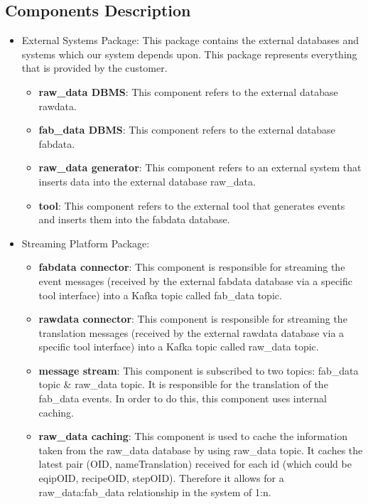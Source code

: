 \subsection{Components Description}
\begin{itemize}
    \item External Systems Package: This package contains the external databases and systems which our system depends upon.
    This package represents everything that is provided by the customer.
    \begin{itemize}
        \item \textbf{raw\_data DBMS}: This component refers to the external database raw\textunderscore data.
        \item \textbf{fab\_data DBMS}: This component refers to the external database fab\textunderscore data.
        \item \textbf{raw\_data generator}: This component refers to an external system that inserts data into the external database raw\_data.
        \item \textbf{tool}: This component refers to the external tool that generates events and inserts them into the fab\textunderscore data database.
    \end{itemize}
    \item Streaming Platform Package:
    \begin{itemize}
        \item \textbf{fab\textunderscore data connector}: This component is responsible for streaming the event messages (received by the external fab\textunderscore data database via a specific tool interface) into a Kafka topic called fab\_data topic.
        \item \textbf{raw\textunderscore data connector}: This component is responsible for streaming the translation messages (received by the external raw\textunderscore data database via a specific tool interface) into a Kafka topic called raw\_data topic.
        \item \textbf{message stream}: This component is subscribed to two topics: fab\_data topic \& raw\_data topic. It is responsible for the translation of the fab\_data events. In order to do this, this component uses internal caching.
        \item \textbf{raw\_data caching}: This component is used to cache the information taken from the raw\_data database by using raw\_data topic. It caches  the latest pair (OID, nameTranslation) received for each id (which could be eqipOID, recipeOID, stepOID). Therefore it allows for a raw\_data:fab\_data relationship in the system of 1:n.

\end{itemize}
\end{itemize}
